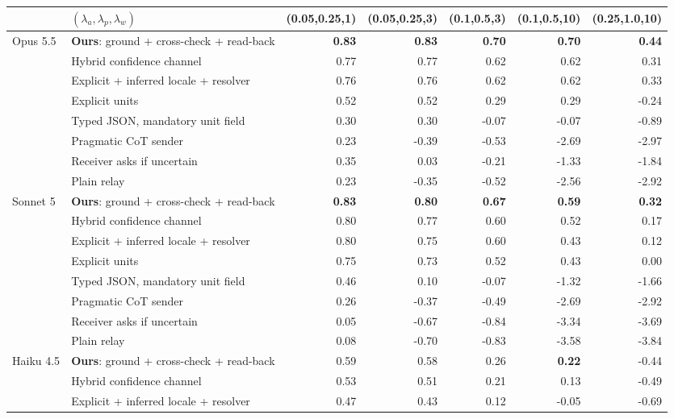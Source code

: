 \begin{tabular}{llrrrrr}
\toprule
 & $(\lambda_a,\lambda_p,\lambda_w)$ & (0.05,0.25,1) & (0.05,0.25,3) & (0.1,0.5,3) & (0.1,0.5,10) & (0.25,1.0,10) \\
\midrule
\multirow{8}{*}{Opus 5.5} & \textbf{Ours}: ground + cross-check + read-back & \textbf{0.83} & \textbf{0.83} & \textbf{0.70} & \textbf{0.70} & \textbf{0.44} \\
 & Hybrid confidence channel & 0.77 & 0.77 & 0.62 & 0.62 & 0.31 \\
 & Explicit + inferred locale + resolver & 0.76 & 0.76 & 0.62 & 0.62 & 0.33 \\
 & Explicit units \citep{miao2026capri} & 0.52 & 0.52 & 0.29 & 0.29 & -0.24 \\
 & Typed JSON, mandatory unit field & 0.30 & 0.30 & -0.07 & -0.07 & -0.89 \\
 & Pragmatic CoT sender \citep{miao2026capri} & 0.23 & -0.39 & -0.53 & -2.69 & -2.97 \\
 & Receiver asks if uncertain \citep{matsnev2026uncertainty} & 0.35 & 0.03 & -0.21 & -1.33 & -1.84 \\
 & Plain relay & 0.23 & -0.35 & -0.52 & -2.56 & -2.92 \\
\midrule
\multirow{8}{*}{Sonnet 5} & \textbf{Ours}: ground + cross-check + read-back & \textbf{0.83} & \textbf{0.80} & \textbf{0.67} & \textbf{0.59} & \textbf{0.32} \\
 & Hybrid confidence channel & 0.80 & 0.77 & 0.60 & 0.52 & 0.17 \\
 & Explicit + inferred locale + resolver & 0.80 & 0.75 & 0.60 & 0.43 & 0.12 \\
 & Explicit units \citep{miao2026capri} & 0.75 & 0.73 & 0.52 & 0.43 & 0.00 \\
 & Typed JSON, mandatory unit field & 0.46 & 0.10 & -0.07 & -1.32 & -1.66 \\
 & Pragmatic CoT sender \citep{miao2026capri} & 0.26 & -0.37 & -0.49 & -2.69 & -2.92 \\
 & Receiver asks if uncertain \citep{matsnev2026uncertainty} & 0.05 & -0.67 & -0.84 & -3.34 & -3.69 \\
 & Plain relay & 0.08 & -0.70 & -0.83 & -3.58 & -3.84 \\
\midrule
\multirow{8}{*}{Haiku 4.5} & \textbf{Ours}: ground + cross-check + read-back & 0.59 & 0.58 & 0.26 & \textbf{0.22} & -0.44 \\
 & Hybrid confidence channel & 0.53 & 0.51 & 0.21 & 0.13 & -0.49 \\
 & Explicit + inferred locale + resolver & 0.47 & 0.43 & 0.12 & -0.05 & -0.69 \\

\end{tabular}
